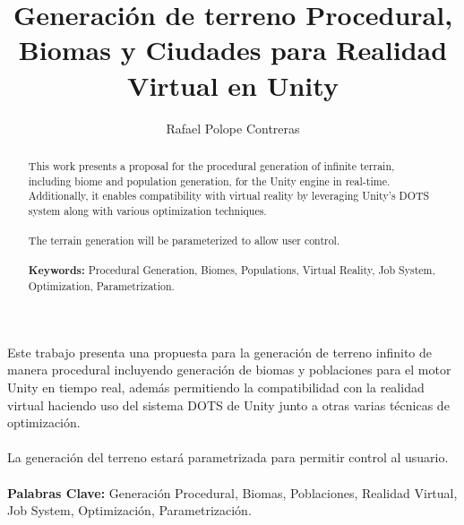\documentclass[book,spanish,a4paper,12pt]{tfg}
\title{Generación de terreno Procedural, Biomas y Ciudades para Realidad Virtual en Unity}
\author{Rafael Polope Contreras}
\begin{document}
\portada
\cleardoublepage


\begin{resumen}
Este trabajo presenta una propuesta para la generación de terreno infinito de manera procedural incluyendo generación de biomas y poblaciones para el motor Unity en tiempo real, además permitiendo la compatibilidad con la realidad virtual haciendo uso del sistema DOTS de Unity junto a otras varias técnicas de optimización. \\
\\
La generación del terreno estará parametrizada para permitir control al usuario.\\
\\
\textbf{Palabras Clave:} Generación Procedural, Biomas, Poblaciones, Realidad Virtual, Job System, Optimización, Parametrización.
\end{resumen}

\cleardoublepage

\begin{abstract}

This work presents a proposal for the procedural generation of infinite terrain, including biome and population generation, for the Unity engine in real-time. Additionally, it enables compatibility with virtual reality by leveraging Unity's DOTS system along with various optimization techniques.\\
\\
The terrain generation will be parameterized to allow user control.\\
\\
\textbf{Keywords:} Procedural Generation, Biomes, Populations, Virtual Reality, Job System, Optimization, Parametrization.
\end{abstract}

\cleardoublepage

\begin{agradecimientos}

\end{agradecimientos}
\cleardoublepage
\end{document}
